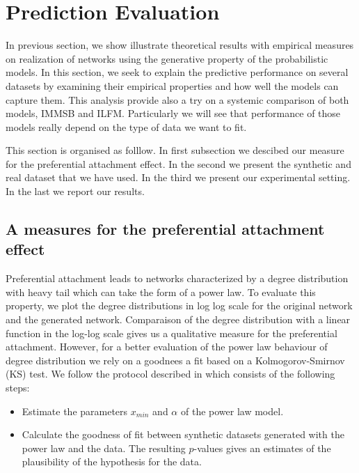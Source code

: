 \section{Prediction Evaluation}
\label{sec:experiments}

In previous section, we show illustrate theoretical results with empirical measures  on realization of networks using the generative property of the probabilistic models. In this section, we seek to explain the predictive performance on several datasets by examining their empirical properties and how well the models can capture them. This analysis provide also a try on a systemic comparison of both models, IMMSB and ILFM. Particularly we will see that performance of those models really depend on the type of data we want to fit.

This section is organised as folllow. In first subsection we descibed our measure for the preferential attachment effect. In the second we present the synthetic and real dataset that we have used. In the third we present our experimental setting. In the last we report our results.

\subsection{A measures for the preferential attachment effect}

Preferential attachment leads to networks characterized by a degree distribution with heavy tail which can take the form of a power law. To evaluate this property,  we  plot the degree distributions in log log scale for the original network and the generated network. Comparaison of the degree distribution with a linear function in the log-log scale  gives us a qualitative measure for the preferential attachment. However, for a better evaluation of the power law behaviour of degree distribution we rely on a  goodnees a fit based on a Kolmogorov-Smirnov (KS) test. We follow the protocol described in \cite{clauset2009power} which consists of the following steps:
\begin{itemize}
	\item Estimate the parameters $x_{min}$ and $\alpha$ of the power law model.
	\item Calculate the goodness of fit between synthetic datasets generated with the power law and the data. The resulting $p$-values gives an estimates of the          plausibility of the hypothesis for the data.
\end{itemize}

